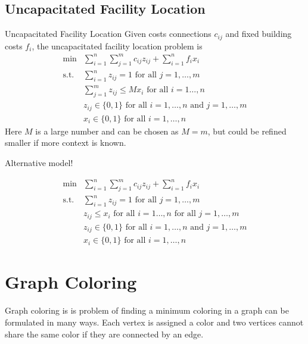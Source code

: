 \subsection{Uncapacitated Facility Location}
\begin{general}{Uncapacitated Facility Location}{\npcomplete}
Given costs connections $c_{ij}$ and fixed building costs $f_i$, the uncapacitated facility location problem is 
\begin{equation}
\begin{array}{rl}
\min & \displaystyle\sum_{i=1}^n\sum_{j=1}^mc_{ij}z_{ij}+\sum_{i=1}^nf_ix_i \\
\text{s.t.} & \displaystyle\sum_{i=1}^nz_{ij}=1 \text{ for all }j=1,\dots,m \\
& \displaystyle \sum_{j=1}^mz_{ij}\leqslant Mx_i\text{ for all }i=1\dots,n \\
&z_{ij}\in\{0,1\}\text{ for all }i=1,\dots,n \text{ and }j=1,\dots,m\\
&x_i\in\{0,1\}\text{ for all } i=1,\dots,n
\end{array}
\end{equation}
Here $M$ is a large number and can be chosen as $M = m$, but could be refined smaller if more context is known.
\end{general}

Alternative model!

\begin{equation}
\begin{array}{rl}
\min & \displaystyle\sum_{i=1}^n\sum_{j=1}^mc_{ij}z_{ij}+\sum_{i=1}^nf_ix_i \\
\text{s.t.} & \displaystyle\sum_{i=1}^nz_{ij}=1 \text{ for all }j=1,\dots,m \\
& z_{ij}\leqslant x_i\text{ for all }i=1\dots,n \text{ for all } j = 1, \dots, m \\
&z_{ij}\in\{0,1\}\text{ for all }i=1,\dots,n \text{ and }j=1,\dots,m\\
&x_i\in\{0,1\}\text{ for all } i=1,\dots,n
\end{array}
\end{equation}
\newpage

\section{Graph Coloring}


Graph coloring  is 
is problem of finding a minimum coloring in a graph can be formulated in many ways. Each vertex is assigned a color and two vertices cannot share the same color if they are connected by an edge.

